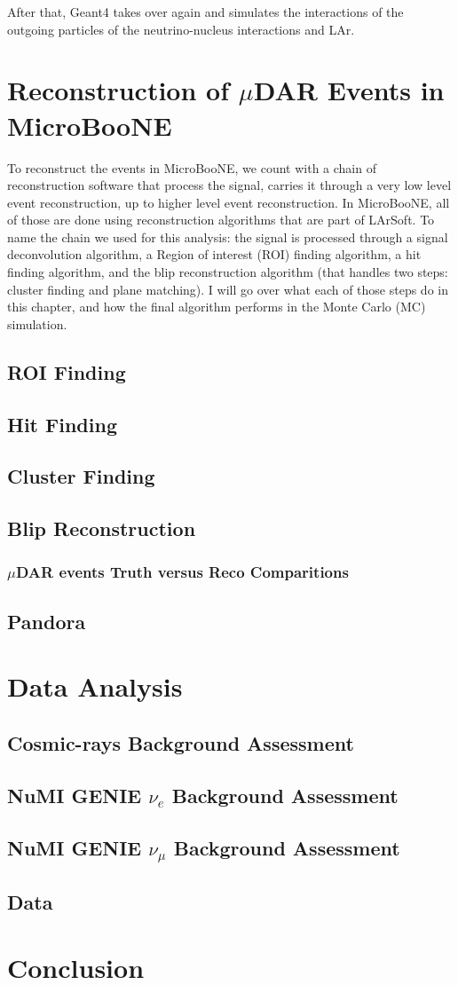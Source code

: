 After that, Geant4 takes over again and simulates the interactions of the outgoing particles of the neutrino-nucleus interactions and LAr. 

\section{Reconstruction of $\mu$DAR Events in MicroBooNE}

To reconstruct the events in MicroBooNE, we count with a chain of reconstruction software that process the signal, carries it through a very low level event reconstruction, up to higher level event reconstruction. In MicroBooNE, all of those are done using reconstruction algorithms that are part of LArSoft. To name the chain we used for this analysis: the signal is processed through a signal deconvolution algorithm, a Region of interest (ROI) finding algorithm, a hit finding algorithm, and the blip reconstruction algorithm (that handles two steps: cluster finding and plane matching). I will go over what each of those steps do in this chapter, and how the final algorithm performs in the Monte Carlo (MC) simulation.  
\subsection{ROI Finding}
\subsection{Hit Finding}
\subsection{Cluster Finding}
\subsection{Blip Reconstruction}
\subsubsection{$\mu$DAR events Truth versus Reco Comparitions}
\subsection{Pandora}

\section{Data Analysis}
\subsection{Cosmic-rays Background Assessment}
\subsection{NuMI GENIE $\nu_e$ Background Assessment}
\subsection{NuMI GENIE $\nu_{\mu}$ Background Assessment}
\subsection{Data}
\section{Conclusion}